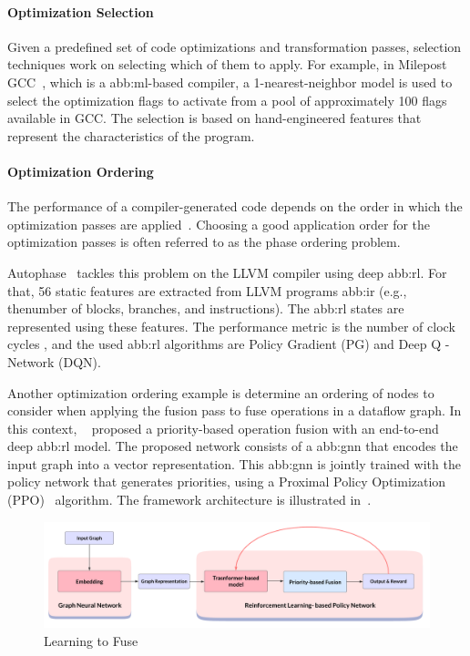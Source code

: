         
            \paragraph{Optimization Selection}
                Given a predefined set of code optimizations and transformation passes, selection techniques work on selecting which of them to apply. For example, in Milepost GCC~\cite{milepost}, which is a \gls{abb:ml}-based compiler, a 1-nearest-neighbor model is used to select the optimization flags to activate from a pool of approximately 100 flags available in GCC. The selection is based on hand-engineered features that represent the characteristics of the program.
            
            \paragraph{Optimization Ordering}
                The performance of a compiler-generated code depends on the order in which the optimization passes are applied~\cite{autophase}. Choosing a good application order for the optimization passes is often referred to as the phase ordering problem. 
                
                Autophase~\cite{autophase} tackles this problem on the LLVM compiler using deep \gls{abb:rl}. For that, 56 static features are extracted from LLVM programs \gls{abb:ir} (e.g., thenumber of blocks, branches, and instructions). The \gls{abb:rl} states are represented using these features. The performance metric is the number of clock cycles , and the used \gls{abb:rl} algorithms are Policy Gradient (PG) and Deep Q -Network (DQN).

                Another optimization ordering example is determine an ordering of nodes to consider when applying the fusion pass to fuse operations in a dataflow graph. In this context, ~\cite{fuse} proposed a priority-based operation fusion with an end-to-end deep \gls{abb:rl} model.
                The proposed network consists of a \gls{abb:gnn} that encodes the input graph into a vector representation. This \gls{abb:gnn} is jointly trained with the policy network that generates priorities, using a Proximal Policy Optimization (PPO)~\cite{ppo} algorithm. The framework architecture is illustrated in~.

                \begin{figure}[hbt!]
                    \begin{center}
                    \includegraphics[width=.9\textwidth]{assets/images/fuse.png}
                    \end{center}
                    \caption{Learning to Fuse~\cite{fuse}}%
                    \label{sec:aco:autosched:fuse}
                \end{figure}

